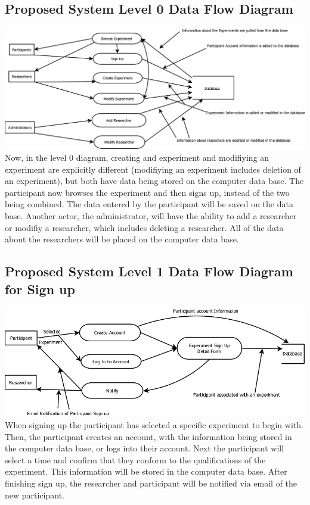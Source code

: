 \subsection{Proposed System Level 0 Data Flow Diagram}
\includegraphics[width=6in]{../other/data-flow-diagrams/new_system_level_0.png}\\
Now, in the level 0 diagram, creating and experiment and modifiying an experiment are explicitly different (modifiying an experiment includes deletion of an experiment), but both have data being stored on the computer data base.  The participant now browses the experiment and then signs up, instead of the two being combined.  The data entered by the participant will be saved on the data base.  Another actor, the administrator, will have the ability to add a researcher or modifiy a researcher, which includes deleting a researcher.  All of the data about the researchers will be placed on the computer data base.

\subsection{Proposed System Level 1 Data Flow Diagram for Sign up}
\includegraphics[width=6in]{../other/data-flow-diagrams/new_system_level_21.png}
When signing up the participant has selected a specific experiment to begin with.  Then, the participant creates an account, with the information being stored in the computer data base, or logs into their account.  Next the participant will select a time and confirm that they conform to the qualifications of the experiment.  This information will be stored in the computer data base.  After finishing sign up, the researcher and participant will be notified via email of the new participant.